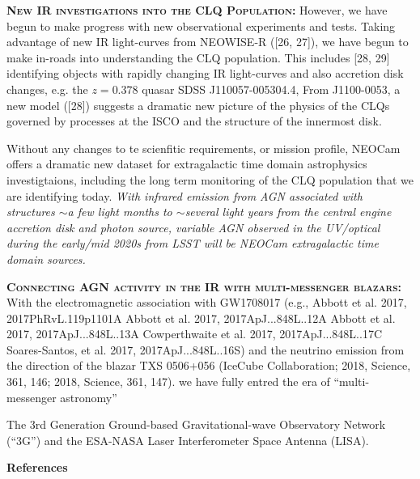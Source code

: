 \documentclass[12pt]{article}
\begin{document}
\smallskip
\smallskip
\noindent
\textbf{\textsc{New IR investigations into the CLQ Population:}}
However, we have begun to make progress with new
observational experiments and tests.  Taking advantage of new IR
light-curves from NEOWISE-R ([26, 27]), we have begun to make in-roads
into understanding the CLQ population.  This includes [28, 29]
identifying objects with rapidly changing IR light-curves and also
accretion disk changes, e.g. the $z=0.378$ quasar SDSS
J110057-005304.4, 
From J1100-0053, a new model ([28]) suggests a dramatic new picture of the physics of the
CLQs governed by processes at the ISCO and the structure of the
innermost disk.  



Without any changes to te scienfitic requirements, or mission profile, NEOCam offers 
a dramatic new dataset for extragalactic time domain astrophysics investigtaions, including
the long term monitoring of the CLQ population that we are identifying today.
{\it With infrared emission from AGN associated with structures $\sim$a few light months to $\sim$several light years from the central engine accretion disk and photon source, variable AGN observed in the UV/optical during the early/mid 2020s from LSST will be NEOCam extragalactic time domain sources.}


\smallskip
\smallskip
\noindent
\textbf{\textsc{Connecting AGN activity in the IR with multi-messenger blazars: }}
With the electromagnetic association with GW1708017 (e.g., 
Abbott et al. 2017,  2017PhRvL.119p1101A	
Abbott et al. 2017,  2017ApJ...848L..12A	
Abbott et al. 2017,  2017ApJ...848L..13A	
Cowperthwaite et al. 2017,  2017ApJ...848L..17C	
Soares-Santos, et al. 2017,  2017ApJ...848L..16S)	
and the neutrino emission from the direction of the blazar TXS 0506+056 
(IceCube Collaboration; 2018, Science, 361, 146; 
2018, Science, 361, 147).
we have  fully entred the era of ``multi-messenger astronomy'' 

The 3rd Generation Ground-based Gravitational-wave Observatory Network
(``3G'') and the ESA-NASA Laser Interferometer Space Antenna (LISA). 

\smallskip
\smallskip
\noindent





\pagebreak
\textbf{References}
\end{document}
